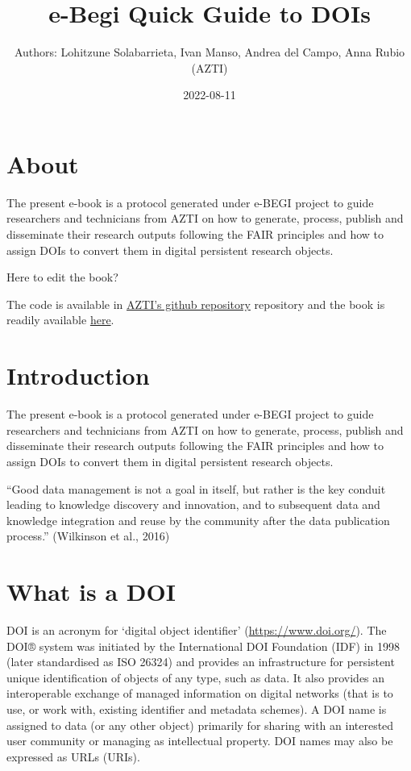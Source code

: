 \documentclass[
]{book}
\title{e-Begi Quick Guide to DOIs}
\author{Authors: Lohitzune Solabarrieta, Ivan Manso, Andrea del Campo, Anna Rubio (AZTI)}
\date{2022-08-11}
\begin{document}
\maketitle

{
\setcounter{tocdepth}{1}
\tableofcontents
}
\hypertarget{about}{%
\chapter*{About}\label{about}}

The present e-book is a protocol generated under e-BEGI project to guide researchers and technicians from AZTI on how to generate, process, publish and disseminate their research outputs following the FAIR principles and how to assign DOIs to convert them in digital persistent research objects.

Here to edit the book?

The code is available in \href{https://github.com/Fundacion-AZTI/ebegi_quickguide2DOIs}{AZTI's github repository} repository and the book is readily available \href{https://fundacion-azti.github.io/ebegi_quickguide2DOIs/}{here}.

\hypertarget{introduction}{%
\chapter{Introduction}\label{introduction}}

The present e-book is a protocol generated under e-BEGI project to guide researchers and technicians from AZTI on how to generate, process, publish and disseminate their research outputs following the FAIR principles and how to assign DOIs to convert them in digital persistent research objects.

``Good data management is not a goal in itself, but rather is the key conduit leading to knowledge discovery and innovation, and to subsequent data and knowledge integration and reuse by the community after the data publication process.'' (Wilkinson et al., 2016)

\hypertarget{what-is-a-doi}{%
\chapter{What is a DOI}\label{what-is-a-doi}}

DOI is an acronym for `digital object identifier' (\url{https://www.doi.org/}). The DOI® system was initiated by the International DOI Foundation (IDF) in 1998 (later standardised as ISO 26324) and provides an infrastructure for persistent unique identification of objects of any type, such as data. It also provides an interoperable exchange of managed information on digital networks (that is to use, or work with, existing identifier and metadata schemes). A DOI name is assigned to data (or any other object) primarily for sharing with an interested user community or managing as intellectual property. DOI names may also be expressed as URLs (URIs).
\end{document}
